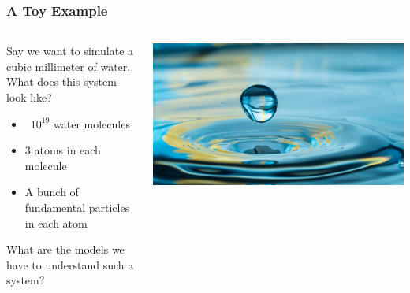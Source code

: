 \documentclass[aspectratio=169, 12pt]{beamer}
\begin{document}
\begin{frame}

    \frametitle{A Toy Example}

    \begin{columns}
    \begin{column}{.6\textwidth}
        Say we want to simulate a cubic millimeter of water. 
        What does this system look like?
    
        \begin{itemize}
            \item ~$10^{19}$ water molecules
            \item $3$ atoms in each molecule
            \item A bunch of fundamental particles in each atom
        \end{itemize}
    
        What are the models we have to understand such a system?
    \end{column}
    \begin{column}{.4\textwidth}
        \includegraphics[scale=0.15]{images/water-droplet.jpg}
    \end{column}
    \end{columns}

\end{frame}
\end{document}
